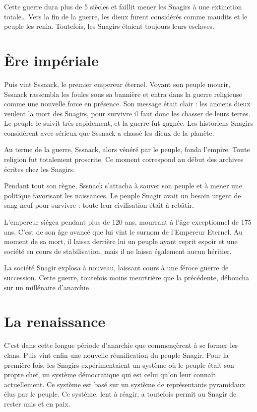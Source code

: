 \begin{multicols}{2}
Cette guerre dura plus de 5 siècles et faillit mener les Snagirs à une extinction totale… Vers la fin de la guerre, les dieux furent considérés comme maudits et le peuple les renia. Toutefois, les Snagirs étaient toujours leurs esclaves.

\section{Ère impériale}

Puis vint Sssnack, le premier empereur éternel. Voyant son peuple mourir, Sssnack rassembla les foules sous sa bannière et entra dans la guerre religieuse comme une nouvelle force en présence. Son message était clair : les anciens dieux veulent la mort des Snagirs, pour survivre il faut donc les chasser de leurs terres. Le peuple le suivit très rapidement, et la guerre fut gagnée. Les historiens Snagirs considèrent avec sérieux que Sssnack a chassé les dieux de la planète. 

Au terme de la guerre, Sssnack, alors vénéré par le peuple, fonda l’empire. Toute religion fut totalement proscrite. Ce moment correspond au début des archives écrites chez les Snagirs.

Pendant tout son règne, Sssnack s’attacha à sauver son peuple et à mener une politique favorisant les naissances. Le peuple Snagir avait un besoin urgent de sang neuf pour survivre : toute leur civilisation était à rebâtir.

L’empereur siégea pendant plus de 120 ans, mourrant à l’âge exceptionnel de 175 ans. C’est de son âge avancé que lui vint le surnom de l’Empereur Eternel. Au moment de sa mort, il laissa derrière lui un peuple ayant reprit espoir et une société en cours de stabilisation, mais il ne laissa également aucun héritier. 

La société Snagir explosa à nouveau, laissant cours à une féroce guerre de succession. Cette guerre, toutefois moins meurtrière que la précédente, déboucha sur un millénaire d’anarchie.

\section{La renaissance}

 C’est dans cette longue période d’anarchie que commençèrent à se former les clans. Puis vint enfin une nouvelle réunification du peuple Snagir. Pour la première fois, les Snagirs expérimentaient un système où le peuple était son propre chef, un système démocratique qui est celui qu’on leur connaît actuellement. Ce système est basé sur un système de représentants pyramidaux élus par le peuple. Ce système, lent à réagir, a toutefois permit au Snagir de rester unis et en paix.


\end{multicols}
